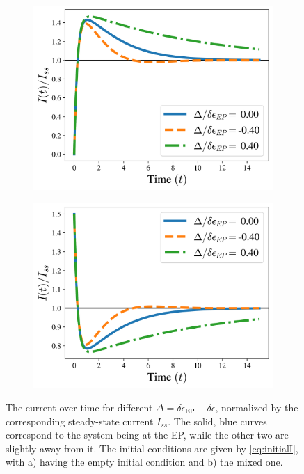 \documentclass[../main.tex]{subfiles}
\begin{document}
\begin{figure}[H]
\centering
\begin{subfigure}[t]{.5\textwidth}
  \centering
  \includegraphics[width=\linewidth]{figures/diffde_empty.png}
  \caption{}
  \label{fig:diffde1}
\end{subfigure}%
\begin{subfigure}[t]{.5\textwidth}
  \centering
  \includegraphics[width=\linewidth]{figures/diffde_mixed.png}
  \caption{}
  \label{fig:diffde2}
\end{subfigure}
\caption{The current over time for different $\Delta = \delta\epsilon_\text{EP} - \delta\epsilon$, normalized by the corresponding steady-state current $I_{ss}$. The solid, blue curves correspond to the system being at the EP, while the other two are slightly away from it. The initial conditions are given by \cref{eq:initialI}, with a) having the empty initial condition and b) the mixed one.}
\label{fig:diffI}
\end{figure}
\end{document}
